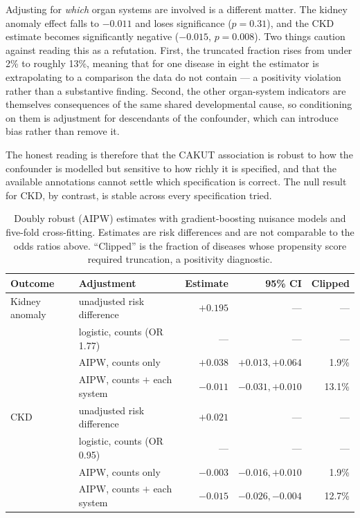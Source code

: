 \documentclass[11pt,a4paper]{article}
\begin{document}
Adjusting for \emph{which} organ systems are involved is a different matter. The kidney
anomaly effect falls to $-0.011$ and loses significance ($p = 0.31$), and the CKD estimate
becomes significantly negative ($-0.015$, $p = 0.008$). Two things caution against reading
this as a refutation. First, the truncated fraction rises from under 2\% to roughly 13\%,
meaning that for one disease in eight the estimator is extrapolating to a comparison the data
do not contain --- a positivity violation rather than a substantive finding. Second, the
other organ-system indicators are themselves consequences of the same shared developmental
cause, so conditioning on them is adjustment for descendants of the confounder, which can
introduce bias rather than remove it.

The honest reading is therefore that the CAKUT association is robust to how the confounder is
modelled but sensitive to how richly it is specified, and that the available annotations
cannot settle which specification is correct. The null result for CKD, by contrast, is stable
across every specification tried.

\begin{table}[H]
\centering
\small
\caption[Doubly robust sensitivity analysis]{Doubly robust (AIPW) estimates with
gradient-boosting nuisance models and five-fold cross-fitting. Estimates are risk
differences and are not comparable to the odds ratios above. ``Clipped'' is the fraction of
diseases whose propensity score required truncation, a positivity diagnostic.}
\label{tab:aipw}
\begin{tabular}{llrrr}
\toprule
Outcome & Adjustment & Estimate & 95\% CI & Clipped \\
\midrule
Kidney anomaly & unadjusted risk difference    & $+0.195$ & ---                & --- \\
               & logistic, counts (OR 1.77)    & ---      & ---                & --- \\
               & AIPW, counts only             & $+0.038$ & $+0.013, +0.064$   & 1.9\% \\
               & AIPW, counts $+$ each system  & $-0.011$ & $-0.031, +0.010$   & 13.1\% \\
\addlinespace
CKD            & unadjusted risk difference    & $+0.021$ & ---                & --- \\
               & logistic, counts (OR 0.95)    & ---      & ---                & --- \\
               & AIPW, counts only             & $-0.003$ & $-0.016, +0.010$   & 1.9\% \\
               & AIPW, counts $+$ each system  & $-0.015$ & $-0.026, -0.004$   & 12.7\% \\
\bottomrule
\end{tabular}
\end{table}
\end{document}
